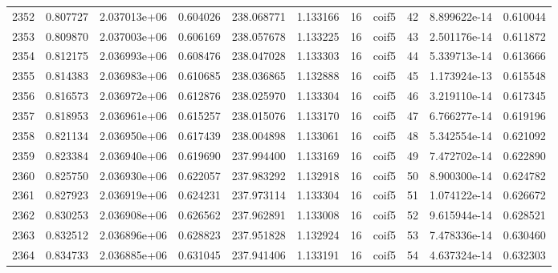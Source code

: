 \begin{tabular}{lrrrrrrlrrr}
2352 &    0.807727 &        2.037013e+06 &  0.604026 &              238.068771 &    1.133166 &      16 &        coif5 &     42 &   8.899622e-14 &      0.610044 \\
2353 &    0.809870 &        2.037003e+06 &  0.606169 &              238.057678 &    1.133225 &      16 &        coif5 &     43 &   2.501176e-14 &      0.611872 \\
2354 &    0.812175 &        2.036993e+06 &  0.608476 &              238.047028 &    1.133303 &      16 &        coif5 &     44 &   5.339713e-14 &      0.613666 \\
2355 &    0.814383 &        2.036983e+06 &  0.610685 &              238.036865 &    1.132888 &      16 &        coif5 &     45 &   1.173924e-13 &      0.615548 \\
2356 &    0.816573 &        2.036972e+06 &  0.612876 &              238.025970 &    1.133304 &      16 &        coif5 &     46 &   3.219110e-14 &      0.617345 \\
2357 &    0.818953 &        2.036961e+06 &  0.615257 &              238.015076 &    1.133170 &      16 &        coif5 &     47 &   6.766277e-14 &      0.619196 \\
2358 &    0.821134 &        2.036950e+06 &  0.617439 &              238.004898 &    1.133061 &      16 &        coif5 &     48 &   5.342554e-14 &      0.621092 \\
2359 &    0.823384 &        2.036940e+06 &  0.619690 &              237.994400 &    1.133169 &      16 &        coif5 &     49 &   7.472702e-14 &      0.622890 \\
2360 &    0.825750 &        2.036930e+06 &  0.622057 &              237.983292 &    1.132918 &      16 &        coif5 &     50 &   8.900300e-14 &      0.624782 \\
2361 &    0.827923 &        2.036919e+06 &  0.624231 &              237.973114 &    1.133304 &      16 &        coif5 &     51 &   1.074122e-14 &      0.626672 \\
2362 &    0.830253 &        2.036908e+06 &  0.626562 &              237.962891 &    1.133008 &      16 &        coif5 &     52 &   9.615944e-14 &      0.628521 \\
2363 &    0.832512 &        2.036896e+06 &  0.628823 &              237.951828 &    1.132924 &      16 &        coif5 &     53 &   7.478336e-14 &      0.630460 \\
2364 &    0.834733 &        2.036885e+06 &  0.631045 &              237.941406 &    1.133191 &      16 &        coif5 &     54 &   4.637324e-14 &      0.632303 \\

\end{tabular}
